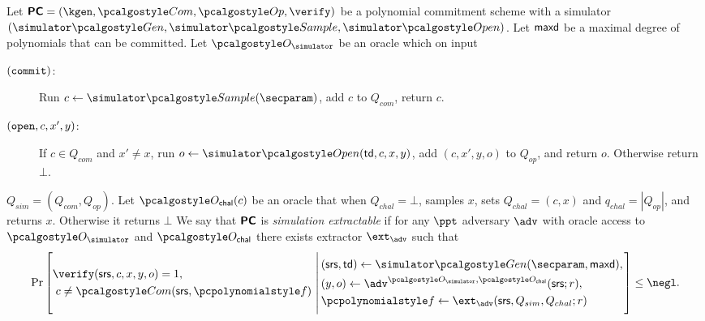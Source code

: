 \documentclass[runningheads,11pt]{llncs}
\begin{document}
\begin{definition}
  \label{def:sepcom}
  Let $\PCOM = (\kgen, \com, \open, \verify)$ be a polynomial commitment
  scheme with a simulator $(\simgen, \simsample, \simopen)$. Let $\mathsf{maxd}$ be a maximal degree of polynomials that can be
  committed.
  Let $\oracles$ be an oracle which on input
  \begin{description}
\item[$(\mathtt{commit})$:] Run $c \gets \simsample(\secparam)$, add $c$ to $Q_{com}$, return $c$.
  \item[$(\mathtt{open}, c, x', y)$:] If $c\in Q_{{com}}$ and $x'\neq x$, run
    $o\gets \simopen(\td,c,x,y)$,  add $(c,x',y,o)$ to $Q_{op}$, and return $o$. Otherwise return $\bot$.
  \end{description}
  $Q_{sim}= (Q_{com},Q_{op})$. Let $\oraclec(c)$ be an oracle that when $Q_{chal}= \bot$, samples $x$, sets $Q_{chal}=(c,x)$ and $q_{{chal}}= |Q_{{op}}|$, and returns $x$. Otherwise it returns $\bot$
  We say that $\bm{\mathsf{PC}}$ is \emph{simulation extractable} if for any $\ppt$
  adversary $\adv$ with oracle access to $\oracles$ and $\oraclec$ there exists extractor
  $\ext_{\adv}$ such that
\[
  \Pr \left[
    \begin{aligned}
      & \verify(\srs, c, x, y, o) = 1, \\
      & \;c \neq \com(\srs, \p{f})\\
    \end{aligned}
    \,\left|\,
      \vphantom{
        \begin{aligned}
          & \\
          & \\
          & \\
          &
        \end{aligned}
        }
    \begin{aligned}
      & (\srs, \td) \gets \simgen(\secparam, \maxdeg),\\
      & (y, o) \gets \adv^{\oracles,\oraclec}(\srs; r), \\
      & \p{f} \gets \ext_\adv(\srs, Q_{sim}, Q_{chal}; r)
    \end{aligned}
  \right.\right]
  \leq \negl.
\]

\end{definition}
\end{document}
